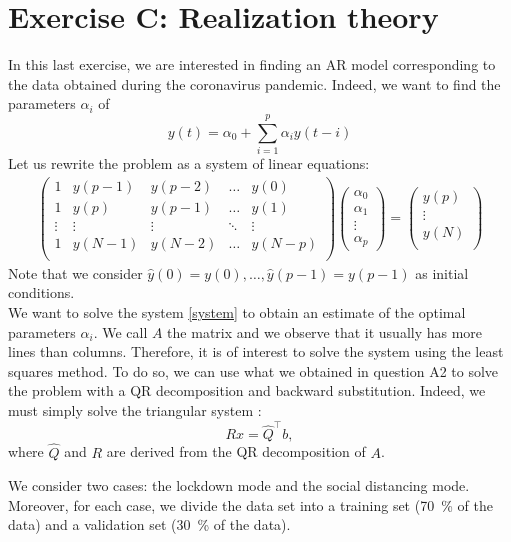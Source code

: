 \documentclass[11pt]{article}
\begin{document}
\section*{Exercise C: Realization theory}

In this last exercise, we are interested in finding an AR model corresponding to the data obtained during the coronavirus pandemic. Indeed, we want to find the parameters $\alpha_i$ of
\[y(t) = \alpha_0 + \sum_{i=1}^p \alpha_iy(t-i)
\]
Let us rewrite the problem as a system of linear equations:
\begin{align}\label{system}
\begin{pmatrix}
1 & y(p-1)& y(p-2)&\dots& y(0)\\
1 & y(p)&y(p-1)&\dots& y(1)\\
\vdots&\vdots &\vdots&\ddots&\vdots\\
1& y(N-1)&y(N-2)&\dots& y(N-p)\\
\end{pmatrix}
\begin{pmatrix}
\alpha_0\\
\alpha_1\\
\vdots\\
\alpha_p
\end{pmatrix}
=
\begin{pmatrix}
y(p)\\
\vdots\\
y(N)\\
\end{pmatrix}
\end{align}
Note that we consider $\hat{y}(0) = y(0),\dots, \hat{y}(p-1) = y(p-1)$ as initial conditions.\\ 
We want to solve the system \eqref{system} to obtain an estimate of the optimal parameters $\alpha_i$. We call $A$ the matrix and we observe that it usually has more lines than columns. Therefore, it is of interest to solve the system using the least squares method. To do so, we can use what we obtained in question A2 to solve the problem with a QR decomposition and backward substitution. Indeed, we must simply solve the triangular system :
\begin{equation*}
Rx = \hat{Q}^\top b,
\end{equation*}
where $\hat{Q}$ and $R$ are derived from the QR decomposition of $A$.

We consider two cases: the lockdown mode and the social distancing mode. Moreover, for each case, we divide the data set into a training set (\SI{70}{\percent} of the data) and a validation set (\SI{30}{\percent} of the data).
\end{document}
